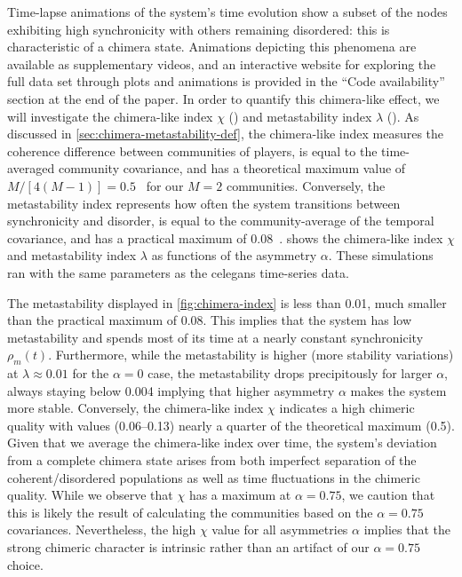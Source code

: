 \documentclass[pdflatex,twocolumn,sn-nature,super]{sn-jnl}
\begin{document}
Time-lapse animations of the system's time evolution
show a subset of the nodes exhibiting high synchronicity
with others remaining disordered: this is characteristic of a chimera state.
Animations depicting this phenomena are available as supplementary videos,
and an interactive website for exploring the full data set
through plots and animations is provided in the ``Code availability''
section at the end of the paper.
In order to quantify this chimera-like effect, we will investigate
the chimera-like index $\chi$ ()
and metastability index $\lambda$ ().
As discussed in \cref{sec:chimera-metastability-def},
the chimera-like index
measures the coherence difference between communities of players,
is equal to the time-averaged community covariance,
and has a theoretical maximum value
of $M/[4(M-1)] = \num{0.5}$~\citep{shanahan2010metastable}
for our $M=2$ communities.
Conversely, the metastability index
represents how often the system transitions
between synchronicity and disorder,
is equal to the community-average of the temporal covariance,
and has a practical maximum of \num{0.08}~\citep{shanahan2010metastable}.
 shows the
 chimera-like index $\chi$
and
 metastability index $\lambda$
as functions of the asymmetry $\alpha$.
These simulations ran with the same parameters as the
\gls{celegans} time-series data.

The metastability displayed in \cref{fig:chimera-index}
is less than \num{0.01}, much smaller
than the practical maximum of \num{0.08}.
This implies that the system has low metastability
and spends most of its time at a nearly constant
synchronicity $\rho_m(t)$.
Furthermore, while the metastability is higher (more stability variations)
at $\lambda \approx \num{0.01}$ for the $\alpha = 0$ case,
the metastability drops precipitously for larger $\alpha$,
always staying below \num{0.004} implying that
higher asymmetry $\alpha$ makes the system more stable.
Conversely, the chimera-like index $\chi$
indicates a high chimeric quality
with values (\numrange{0.06}{0.13})
nearly a quarter of the theoretical maximum (\num{0.5}).
Given that we average the chimera-like index over time,
the system's deviation from a complete chimera state
arises from both imperfect separation of the coherent/disordered populations
as well as time fluctuations in the chimeric quality.
While we observe that $\chi$ has a maximum at $\alpha = \num{0.75}$,
we caution that this is likely the result of calculating the communities
based on the $\alpha = \num{0.75}$ covariances.
Nevertheless, the high $\chi$ value for all asymmetries $\alpha$
implies that the strong chimeric character is intrinsic
rather than an artifact of our $\alpha = \num{0.75}$ choice.
\end{document}
